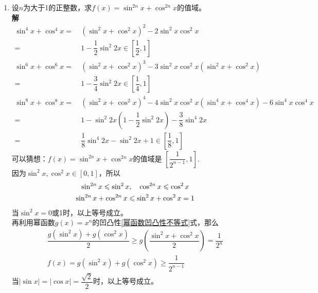 \begin{enumerate}[label={【\textbf{例\thechapter.\arabic*}】},
 leftmargin=\inteval{\myenumleftmargin}pt,
 itemsep=\inteval{\myenumitempsep}pt,
 itemindent=\inteval{\myenumitemindent}pt]
\item 设$ n $为大于1的正整数，求$ f(x)=\sin^{2n}x+\cos^{2n}x $的值域。\\
\textbf{解}\ 
\begin{align*}
    \sin^{4}x+\cos^{4}x =&\ (\sin^{2}x+\cos^{2}x)^2-2\sin^{2}x\cos^{2}x\\
    =&\ 1-\dfrac{1}{2}\sin^2 2x\in\left[\dfrac{1}{2},1\right] \\
    \sin^{6}x+\cos^{6}x =&\ (\sin^{2}x+\cos^{2}x)^3
    -3\sin^{2}x\cos^{2}x (\sin^{2}x+\cos^{2}x) \\
    =&\ 1-\dfrac{3}{4}\sin^2 2x\in\left[\dfrac{1}{4},1\right] \\
    \sin^{8}x+\cos^{8}x =&\ (\sin^{2}x+\cos^{2}x)^4
    -4\sin^{2}x\cos^{2}x (\sin^{4}x+\cos^{4}x)-6\sin^{4}x\cos^{4}x\\
    =&\ 1-\sin^2 2x\left(1-\dfrac{1}{2}\sin^2 2x\right)
    -\dfrac{3}{8}\sin^4 2x \\
    =&\ \dfrac{1}{8}\sin^4 2x-\sin^2 2x+1 
    \in\left[\dfrac{1}{8},1\right]
\end{align*}
可以猜想：$ f(x)=\sin^{2n}x+\cos^{2n}x $的值域是
$ \left[\dfrac{1}{2^{n-1}},1\right] $. \\
因为$ \sin^2 x,\cos^2 x\in[0,1] $，所以
\begin{gather*}
    \sin^{2n}x\leqslant \sin^2 x ,\quad \cos^{2n}x\leqslant \cos^2 x  \\ \sin^{2n}x+\cos^{2n}x\leqslant \sin^{2}x+\cos^{2}x=1
\end{gather*}
当$ \sin^2 x=0 $或1时，以上等号成立。\\
再利用幂函数$ g(x)=x^n $的凹凸性\eqref{幂函数凹凸性不等式}式，那么
\begin{gather*}
    \dfrac{g(\sin^2 x)+g(\cos^2 x)}{2}\geq g\left(
    \dfrac{\sin^2 x+\cos^2 x}{2}\right)=\dfrac{1}{2^n} \\
    f(x)=g(\sin^2 x)+g(\cos^2 x)\geq \dfrac{1}{2^{n-1}}
\end{gather*}
当$ |\sin x|=|\cos x|=\dfrac{\sqrt{2}}{2} $时，以上等号成立。


\end{enumerate}
